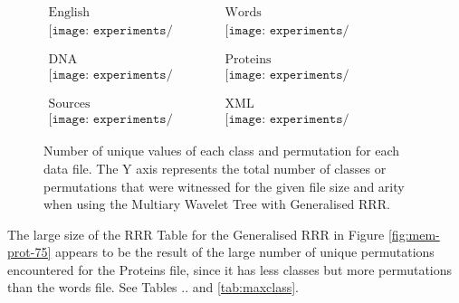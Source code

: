 \begin{figure}[h]
\begin{center}$
\begin{array}{cc}
\mbox{English} & \mbox{Words} \\
\texttt{[image: experiments/unique\_english]} &
\texttt{[image: experiments/unique\_english\_ints]} \\ \\ \\
\mbox{DNA} & \mbox{Proteins} \\ 
\texttt{[image: experiments/unique\_dna]} &
\texttt{[image: experiments/unique\_proteins]} \\ \\ \\
\mbox{Sources} & \mbox{XML} \\
\texttt{[image: experiments/unique\_sources]} &
\texttt{[image: experiments/unique\_dblp\_xml]}
\end{array}$
\end{center}
\caption{Number of unique values of each class and permutation for each data 
file. The Y axis represents the total number of classes or 
permutations that were witnessed for the given file size and arity when using 
the Multiary Wavelet Tree with Generalised RRR.}
\label{fig:unique}
\end{figure}
		

The large size of the RRR Table for the Generalised RRR in Figure 
\ref{fig:mem-prot-75} appears to be the result of the large number of unique
permutations encountered for the Proteins file, since it has less classes but 
more permutations than the words file. See Tables .. and \ref{tab:maxclass}.


